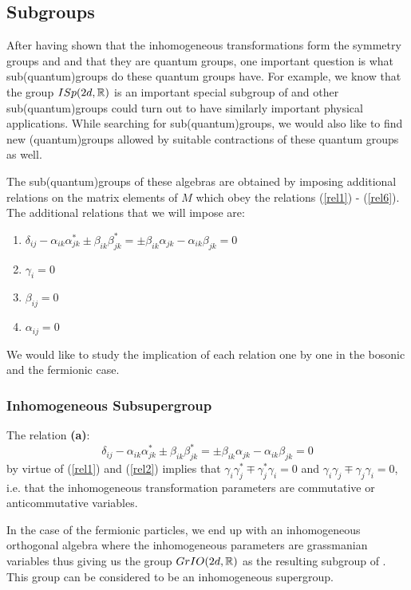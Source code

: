 \subsection{Subgroups}
After having shown that the inhomogeneous transformations form the
symmetry groups \FIO and \BISp and that they are quantum groups,
one important question is what sub(quantum)groups do these quantum
groups have. For example, we know that the group $ISp(2d, \mathbb{R})$ is
an important special subgroup of \BISp and other
sub(quantum)groups could turn out to have similarly important
physical applications. While searching for sub(quantum)groups, we
would also like to find new (quantum)groups allowed by suitable
contractions \cite{inonu} of these quantum groups as well.

The sub(quantum)groups of these algebras are obtained by imposing
additional relations on the matrix elements of $M$ which obey the
relations (\ref{rel1}) - (\ref{rel6}). The additional relations
that we will impose are:
\begin{enumerate}
\renewcommand{\labelenumi}{\bf(\alph{enumi})}
\item $\delta_{ij} - \alpha_{ik}\alpha^*_{jk} \pm \beta_{ik} \beta^*_{jk} = \pm \beta_{ik} \alpha_{jk} - \alpha_{ik} \beta_{jk} = 0$
\item $\gamma_i = 0$
\item $\beta_{ij} = 0$
\item $\alpha_{ij} = 0$
\end{enumerate}

We would like to study the implication of each relation one by one
in the bosonic and the fermionic case.

\subsubsection{Inhomogeneous Subsupergroup}
The relation {\bf(a)}:
\[
\delta_{ij} - \alpha_{ik}\alpha^*_{jk} \pm \beta_{ik} \beta^*_{jk}
= \pm \beta_{ik} \alpha_{jk} - \alpha_{ik} \beta_{jk} = 0
\]
by virtue of (\ref{rel1}) and (\ref{rel2}) implies that $\gamma_i
\gamma^*_j \mp \gamma^*_j \gamma_i = 0$ and $\gamma_i \gamma_j \mp
\gamma_j \gamma_i = 0$, i.e. that the inhomogeneous transformation
parameters are commutative or anticommutative variables.

In the case of the fermionic particles, we end up with an
inhomogeneous orthogonal algebra where the inhomogeneous
parameters are grassmanian variables thus giving us the group
$GrIO(2d, \mathbb{R})$ as the resulting subgroup of \FIO. This group can
be considered to be an inhomogeneous supergroup.

